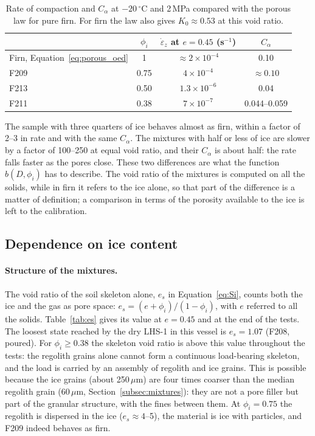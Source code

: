 \begin{table}[H]
\centering
\small
\begin{tabular}{@{}lccc@{}}
\toprule
 & $\phi_i$ & $\dot\varepsilon_z$ at $e = 0.45$ (s$^{-1}$) & $C_\alpha$ \\
\midrule
Firn, Equation~\eqref{eq:porous_oed} & 1 & $\approx2\times10^{-4}$ & 0.10 \\
F209 & 0.75 & $4\times10^{-4}$ & $\approx0.10$ \\
F213 & 0.50 & $1.3\times10^{-6}$ & 0.04 \\
F211 & 0.38 & $7\times10^{-7}$ & 0.044--0.059 \\
\bottomrule
\end{tabular}
\caption{Rate of compaction and $C_\alpha$ at $-20\,^\circ$C and 2\,MPa compared with the porous law for pure firn. For firn the law also gives $K_0\approx0.53$ at this void ratio.}
\label{tab:firn_comparison}
\end{table}

The sample with three quarters of ice behaves almost as firn, within a factor of 2--3 in rate and with the same $C_\alpha$. The mixtures with half or less of ice are slower by a factor of 100--250 at equal void ratio, and their $C_\alpha$ is about half: the rate falls faster as the pores close. These two differences are what the function $b(D,\phi_i)$ has to describe. The void ratio of the mixtures is computed on all the solids, while in firn it refers to the ice alone, so that part of the difference is a matter of definition; a comparison in terms of the porosity available to the ice is left to the calibration.

\subsection{Dependence on ice content}
\label{subsec:cal_ice}

\paragraph{Structure of the mixtures.} The void ratio of the soil skeleton alone, $e_s$ in Equation~\eqref{eq:Si}, counts both the ice and the gas as pore space: $e_s = (e+\phi_i)/(1-\phi_i)$, with $e$ referred to all the solids. Table~\ref{tab:es} gives its value at $e = 0.45$ and at the end of the tests. The loosest state reached by the dry LHS-1 in this vessel is $e_s = 1.07$ (F208, poured). For $\phi_i\ge0.38$ the skeleton void ratio is above this value throughout the tests: the regolith grains alone cannot form a continuous load-bearing skeleton, and the load is carried by an assembly of regolith and ice grains. This is possible because the ice grains (about 250\,$\mu$m) are four times coarser than the median regolith grain (60\,$\mu$m, Section~\ref{subsec:mixtures}): they are not a pore filler but part of the granular structure, with the fines between them. At $\phi_i = 0.75$ the regolith is dispersed in the ice ($e_s\approx4$--5), the material is ice with particles, and F209 indeed behaves as firn.

